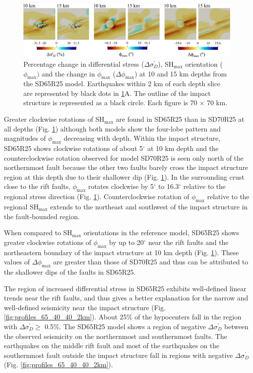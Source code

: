 \documentclass[draft]{agujournal2018}
\begin{document}
\begin{figure}[ht]
\centering
\includegraphics[width=30pc]{Figures/SD65R25_2.png}
\caption{Percentage change in differential stress ($\Delta\sigma_{D}^{\prime}$), SH$_{\max}$ orientation ($\phi_{\max})$ and the change in $\phi_{\max}$ ($\Delta\phi_{\max}$) at 10 and 15 km depths from the SD65R25 model. Earthquakes within 2 km of each depth slice are represented by black dots in \ref{fig:eff_of_dips}A. The outline of the impact structure is represented as a black circle. Each figure is 70 $\times$ 70 km.}
\label{fig:eff_of_dips}
\end{figure}

Greater clockwise rotations of SH$_{\max}$ are found in SD65R25 than in SD70R25 at all depths (Fig. \ref{fig:eff_of_dips}) although both models show the four-lobe pattern and magnitudes of $\phi_{\max}$ decreasing with depth. Within the impact structure, SD65R25 shows clockwise rotations of about 5$^\circ$ at 10 km depth and the counterclockwise rotation observed for model SD70R25 is seen only north of the northernmost fault because the other two faults barely cross the impact structure region at this depth due to their shallower dip (Fig. \ref{fig:eff_of_dips}). In the surrounding crust close to the rift faults, $\phi_{\max}$ rotates clockwise by 5$^\circ$ to 16.3$^\circ$ relative to the regional stress direction (Fig. \ref{fig:eff_of_dips}). Counterclockwise rotation of $\phi_{\max}$ relative to the regional SH$_{\max}$ extends to the northeast and southwest of the impact structure in the fault-bounded region.

When compared to SH$_{\max}$ orientations in the reference model, SD65R25 shows greater clockwise rotations of $\phi_{\max}$ by up to 20$^\circ$ near the rift faults and the northeastern boundary of the impact structure at 10 km depth (Fig. \ref{fig:eff_of_dips}). These values of $\Delta \phi_{\max}$ are greater than those of SD70R25 and thus can be attributed to the shallower dips of the faults in SD65R25.

The region of increased differential stress in SD65R25 exhibits well-defined linear trends near the rift faults, and thus gives a better explanation for the narrow and well-defined seismicity near the impact structure (Fig. \ref{fig:profiles_65_40_40_2km}). About 25\% of the hypocenters fall in the region with $\Delta\sigma_{D}^{\prime} \ge$ 0.5\%. The SD65R25 model shows a region of negative $\Delta\sigma_{D}^{\prime}$ between the observed seismicity on the northernmost and southernmost faults. The earthquakes on the middle rift fault and most of the earthquakes on the southernmost fault outside the impact structure fall in regions with negative $\Delta\sigma_{D}^{\prime}$ (Fig. \ref{fig:profiles_65_40_40_2km}).
\end{document}
